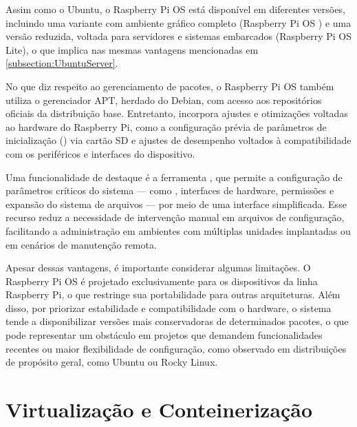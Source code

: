 Assim como o Ubuntu, o Raspberry Pi OS está disponível em diferentes versões, incluindo uma variante com ambiente gráfico completo (Raspberry Pi OS ) e uma versão reduzida, voltada para servidores e sistemas embarcados (Raspberry Pi OS Lite), o que implica nas mesmas vantagens mencionadas em \ref{subsection:UbuntuServer}.

No que diz respeito ao gerenciamento de pacotes, o Raspberry Pi OS também utiliza o gerenciador APT, herdado do Debian, com acesso aos repositórios oficiais da distribuição base. Entretanto, incorpora ajustes e otimizações voltadas ao hardware do Raspberry Pi, como a configuração prévia de parâmetros de inicialização () via cartão SD e ajustes de desempenho voltados à compatibilidade com os periféricos e interfaces do dispositivo.

Uma funcionalidade de destaque é a ferramenta , que permite a configuração de parâmetros críticos do sistema — como , interfaces de hardware, permissões e expansão do sistema de arquivos — por meio de uma interface simplificada. Esse recurso reduz a necessidade de intervenção manual em arquivos de configuração, facilitando a administração em ambientes com múltiplas unidades implantadas ou em cenários de manutenção remota.

Apesar dessas vantagens, é importante considerar algumas limitações. O Raspberry Pi OS é projetado exclusivamente para os dispositivos da linha Raspberry Pi, o que restringe sua portabilidade para outras arquiteturas. Além disso, por priorizar estabilidade e compatibilidade com o hardware, o sistema tende a disponibilizar versões mais conservadoras de determinados pacotes, o que pode representar um obstáculo em projetos que demandem funcionalidades recentes ou maior flexibilidade de configuração, como observado em distribuições de propósito geral, como Ubuntu ou Rocky Linux.

\section{Virtualização e Conteinerização}
\label{section:Virtualizacao}



